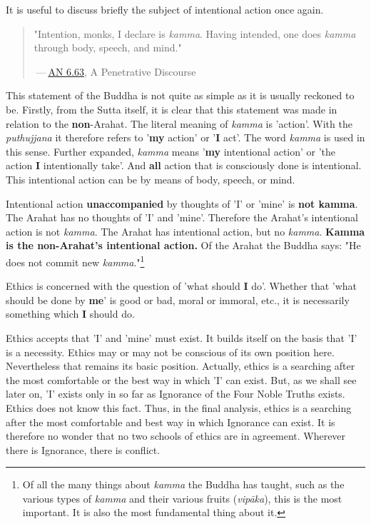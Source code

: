 It is useful to discuss briefly the subject of intentional action once again.

\begin{quote}
"Intention, monks, I declare is \emph{kamma}. Having intended, one does \emph{kamma} through body, speech, and mind."

 --- \href{https://suttacentral.net/an6.63/en/thanissaro}{AN 6.63}, A Penetrative Discourse
\end{quote}

This statement of the Buddha is not quite as simple as it is usually reckoned to be. Firstly, from the Sutta itself, it is clear that this statement was made in relation to the \textbf{non}-Arahat. The literal meaning of \emph{kamma} is 'action'. With the \emph{puthujjana} it therefore refers to '\textbf{my} action' or '\textbf{I} act'. The word \emph{kamma} is used in this sense. Further expanded, \emph{kamma} means '\textbf{my} intentional action' or 'the action \textbf{I} intentionally take'. And \textbf{all} action that is consciously done is intentional. This intentional action can be by means of body, speech, or mind.

Intentional action \textbf{unaccompanied} by thoughts of 'I' or 'mine' is \textbf{not kamma}. The Arahat has no thoughts of 'I' and 'mine'. Therefore the Arahat's intentional action is not \emph{kamma}. The Arahat has intentional action, but no \emph{kamma}. \textbf{Kamma is the non-Arahat's intentional action.} Of the Arahat the Buddha says: "He does not commit new \emph{kamma}."\footnote{Of all the many things about \emph{kamma} the Buddha has taught, such as the various types of \emph{kamma} and their various fruits (\emph{vipāka}), this is the most important. It is also the most fundamental thing about it.}

Ethics is concerned with the question of 'what should \textbf{I} do'. Whether that 'what should be done by \textbf{me}' is good or bad, moral or immoral, etc., it is necessarily something which \textbf{I} should do.

Ethics accepts that 'I' and 'mine' must exist. It builds itself on the basis that 'I' is a necessity. Ethics may or may not be conscious of its own position here. Nevertheless that remains its basic position. Actually, ethics is a searching after the most comfortable or the best way in which 'I' can exist. But, as we shall see later on, 'I' exists only in so far as Ignorance of the Four Noble Truths exists. Ethics does not know this fact. Thus, in the final analysis, ethics is a searching after the most comfortable and best way in which Ignorance can exist. It is therefore no wonder that no two schools of ethics are in agreement. Wherever there is Ignorance, there is conflict.

